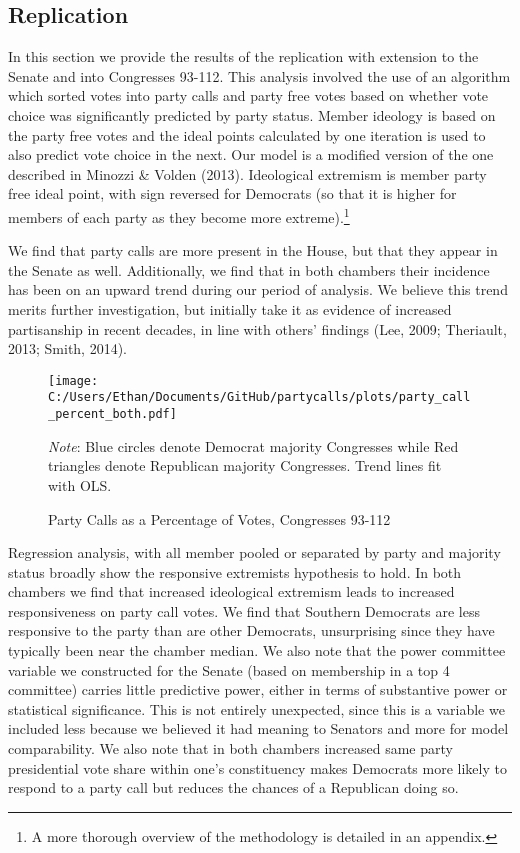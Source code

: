 \documentclass[12pt]{article}
\newcommand\fnote[1]{\captionsetup{font=small}\caption*{#1}}
\begin{document}
\subsection{Replication}

In this section we provide the results of the replication with extension to the Senate and into Congresses 93-112. This analysis involved the use of an algorithm which sorted votes into party calls and party free votes based on whether vote choice was significantly predicted by party status. Member ideology is based on the party free votes and the ideal points calculated by one iteration is used to also predict vote choice in the next. Our model is a modified version of the one described in Minozzi \& Volden (2013). Ideological extremism is member party free ideal point, with sign reversed for Democrats (so that it is higher for members of each party as they become more extreme).\footnote{A more thorough overview of the methodology is detailed in an appendix.}

We find that party calls are more present in the House, but that they appear in the Senate as well. Additionally, we find that in both chambers their incidence has been on an upward trend during our period of analysis. We believe this trend merits further investigation, but initially take it as evidence of increased partisanship in recent decades, in line with others' findings (Lee, 2009; Theriault, 2013; Smith, 2014).


\begin{figure}[H]
	\centering
	\caption{Party Calls as a Percentage of Votes, Congresses 93-112}
	\texttt{[image: C:/Users/Ethan/Documents/GitHub/partycalls/plots/party\_call\_percent\_both.pdf]}
	\fnote{\textit{Note}: Blue circles denote Democrat majority Congresses while Red triangles denote Republican majority Congresses. Trend lines fit with OLS.}
\end{figure}

Regression analysis, with all member pooled or separated by party and majority status broadly show the responsive extremists hypothesis to hold. In both chambers we find that increased ideological extremism leads to increased responsiveness on party call votes. We find that Southern Democrats are less responsive to the party than are other Democrats, unsurprising since they have typically been near the chamber median. We also note that the power committee variable we constructed for the Senate (based on membership in a top 4 committee) carries little predictive power, either in terms of substantive power or statistical significance. This is not entirely unexpected, since this is a variable we included less because we believed it had meaning to Senators and more for model comparability. We also note that in both chambers increased same party presidential vote share within one's constituency makes Democrats more likely to respond to a party call but reduces the chances of a Republican doing so.
\end{document}
